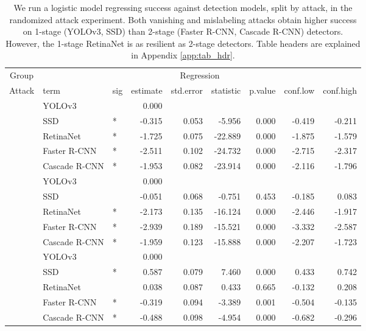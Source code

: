 \documentclass[
]{article}
\begin{document}
\begingroup\fontsize{9}{11}\selectfont

\begin{longtable}[t]{lllrrrrrr}
\caption{\label{tab:model_stage_table}We run a logistic model regressing success against detection models, split by attack, in the randomized attack experiment. Both vanishing and mislabeling attacks obtain higher success on 1-stage (YOLOv3, SSD) than 2-stage (Faster R-CNN, Cascade R-CNN) detectors. However, the 1-stage RetinaNet is as resilient as 2-stage detectors. Table headers are explained in Appendix \ref{app:tab_hdr}.}\\
\toprule
\multicolumn{1}{c}{Group} & \multicolumn{8}{c}{Regression} \\
\cmidrule(l{3pt}r{3pt}){1-1} \cmidrule(l{3pt}r{3pt}){2-9}
Attack & term & sig & estimate & std.error & statistic & p.value & conf.low & conf.high\\
\midrule
 & YOLOv3 &  & 0.000 &  &  &  &  & \\
\cmidrule{2-9}\nopagebreak
 & SSD & * & -0.315 & 0.053 & -5.956 & 0.000 & -0.419 & -0.211\\
\cmidrule{2-9}\nopagebreak
 & RetinaNet & * & -1.725 & 0.075 & -22.889 & 0.000 & -1.875 & -1.579\\
\cmidrule{2-9}\nopagebreak
 & Faster R-CNN & * & -2.511 & 0.102 & -24.732 & 0.000 & -2.715 & -2.317\\
\cmidrule{2-9}\nopagebreak
\multirow{-5}{*}{\raggedright\arraybackslash Vanishing} & Cascade R-CNN & * & -1.953 & 0.082 & -23.914 & 0.000 & -2.116 & -1.796\\
\cmidrule{1-9}\pagebreak[0]
 & YOLOv3 &  & 0.000 &  &  &  &  & \\
\cmidrule{2-9}\nopagebreak
 & SSD &  & -0.051 & 0.068 & -0.751 & 0.453 & -0.185 & 0.083\\
\cmidrule{2-9}\nopagebreak
 & RetinaNet & * & -2.173 & 0.135 & -16.124 & 0.000 & -2.446 & -1.917\\
\cmidrule{2-9}\nopagebreak
 & Faster R-CNN & * & -2.939 & 0.189 & -15.521 & 0.000 & -3.332 & -2.587\\
\cmidrule{2-9}\nopagebreak
\multirow{-5}{*}{\raggedright\arraybackslash Mislabeling} & Cascade R-CNN & * & -1.959 & 0.123 & -15.888 & 0.000 & -2.207 & -1.723\\
\cmidrule{1-9}\pagebreak[0]
 & YOLOv3 &  & 0.000 &  &  &  &  & \\
\cmidrule{2-9}\nopagebreak
 & SSD & * & 0.587 & 0.079 & 7.460 & 0.000 & 0.433 & 0.742\\
\cmidrule{2-9}\nopagebreak
 & RetinaNet &  & 0.038 & 0.087 & 0.433 & 0.665 & -0.132 & 0.208\\
\cmidrule{2-9}\nopagebreak
 & Faster R-CNN & * & -0.319 & 0.094 & -3.389 & 0.001 & -0.504 & -0.135\\
\cmidrule{2-9}\nopagebreak
\multirow{-5}{*}{\raggedright\arraybackslash Untargeted} & Cascade R-CNN & * & -0.488 & 0.098 & -4.954 & 0.000 & -0.682 & -0.296\\
\bottomrule
\end{longtable}
\endgroup{}
\end{document}

